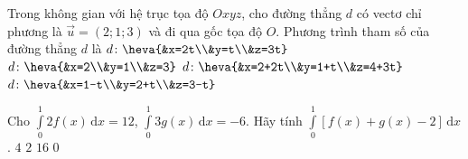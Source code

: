 \begin{ex}%
	Trong không gian với hệ trục tọa độ $Oxyz$, cho đường thẳng $d$ có vectơ chỉ phương là $\overrightarrow{u}=(2;1;3)$ và đi qua gốc tọa độ $O$. Phương trình tham số của đường thẳng $d$ là
	\choice
	{\True $d\colon\heva{&x=2t\\&y=t\\&z=3t}$}
	{$d\colon\heva{&x=2\\&y=1\\&z=3}$}
	{$d\colon\heva{&x=2+2t\\&y=1+t\\&z=4+3t}$}
	{$d\colon\heva{&x=1-t\\&y=2+t\\&z=3-t}$}
\end{ex}

\begin{ex}%
	Cho $\displaystyle\int\limits_{0}^{1}2f(x)\mathrm{\,d}x=12$, $\displaystyle\int\limits_{0}^{1}3g(x)\mathrm{\,d}x=-6$. Hãy tính $\displaystyle\int\limits_{0}^{1}\left[f(x)+g(x)-2\right]\mathrm{\,d}x$.
	\choice
	{$4$}
	{\True $2$}
	{$16$}
	{$0$}
\end{ex}

